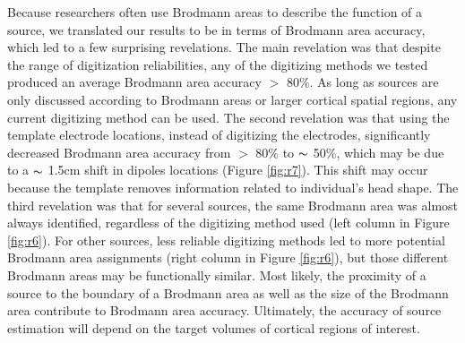 \documentclass{UCF_ETD}
\begin{document}
Because researchers often use Brodmann areas to describe the function of a source, we translated our results to be in terms of Brodmann area accuracy, which led to a few surprising revelations. The main revelation was that despite the range of digitization reliabilities, any of the digitizing methods we tested produced an average Brodmann area accuracy $>$ 80\%. As long as sources are only discussed according to Brodmann areas or larger cortical spatial regions, any current digitizing method can be used. The second revelation was that using the template electrode locations, instead of digitizing the electrodes, significantly decreased Brodmann area accuracy from $>$ 80\% to $\thicksim$ 50\%, which may be due to a $\thicksim$ 1.5cm shift in dipoles locations (Figure \ref{fig:r7}). This shift may occur because the template removes information related to individual's head shape. The third revelation was that for several sources, the same Brodmann area was almost always identified, regardless of the digitizing method used (left column in Figure \ref{fig:r6}). For other sources, less reliable digitizing methods led to more potential Brodmann area assignments (right column in Figure \ref{fig:r6}), but those different Brodmann areas may be functionally similar. Most likely, the proximity of a source to the boundary of a Brodmann area as well as the size of the Brodmann area contribute to Brodmann area accuracy. Ultimately, the accuracy of source estimation will depend on the target volumes of cortical regions of interest.
\end{document}
